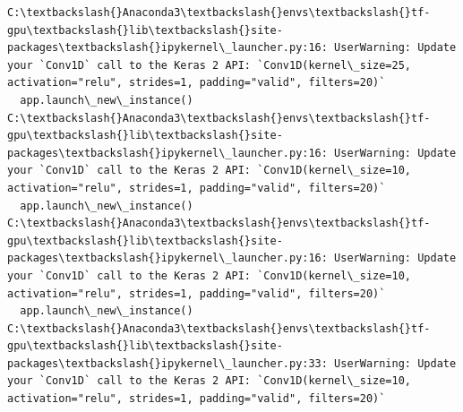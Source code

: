 \documentclass[11pt]{article}
\begin{document}
    \begin{Verbatim}[commandchars=\\\{\}]
C:\textbackslash{}Anaconda3\textbackslash{}envs\textbackslash{}tf-gpu\textbackslash{}lib\textbackslash{}site-packages\textbackslash{}ipykernel\_launcher.py:16: UserWarning: Update your `Conv1D` call to the Keras 2 API: `Conv1D(kernel\_size=25, activation="relu", strides=1, padding="valid", filters=20)`
  app.launch\_new\_instance()
C:\textbackslash{}Anaconda3\textbackslash{}envs\textbackslash{}tf-gpu\textbackslash{}lib\textbackslash{}site-packages\textbackslash{}ipykernel\_launcher.py:16: UserWarning: Update your `Conv1D` call to the Keras 2 API: `Conv1D(kernel\_size=10, activation="relu", strides=1, padding="valid", filters=20)`
  app.launch\_new\_instance()
C:\textbackslash{}Anaconda3\textbackslash{}envs\textbackslash{}tf-gpu\textbackslash{}lib\textbackslash{}site-packages\textbackslash{}ipykernel\_launcher.py:16: UserWarning: Update your `Conv1D` call to the Keras 2 API: `Conv1D(kernel\_size=10, activation="relu", strides=1, padding="valid", filters=20)`
  app.launch\_new\_instance()
C:\textbackslash{}Anaconda3\textbackslash{}envs\textbackslash{}tf-gpu\textbackslash{}lib\textbackslash{}site-packages\textbackslash{}ipykernel\_launcher.py:33: UserWarning: Update your `Conv1D` call to the Keras 2 API: `Conv1D(kernel\_size=10, activation="relu", strides=1, padding="valid", filters=20)`

    \end{Verbatim}
\end{document}
